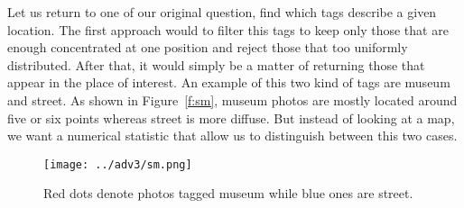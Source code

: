 Let us return to one of our original question, find which tags describe a given
location. The first approach would to filter this  tags to keep
only those that are enough concentrated at one position and reject those that
too uniformly distributed. After that, it would simply be a matter of
returning those that appear in the place of interest. An example of this two
kind of tags are \textsf{museum} and \textsf{street}. As shown in
Figure~\vref{f:sm}, \textsf{museum} photos are mostly located around five or
six points whereas \textsf{street} is more diffuse. But instead of looking at
a map, we want a numerical statistic that allow us to distinguish between this
two cases.

\begin{figure}[hbtp]
	\centering
	\texttt{[image: ../adv3/sm.png]}
	\caption{Red dots denote photos tagged \textsf{museum} while blue ones are
	\textsf{street}.\label{f:sm}}
\end{figure}
